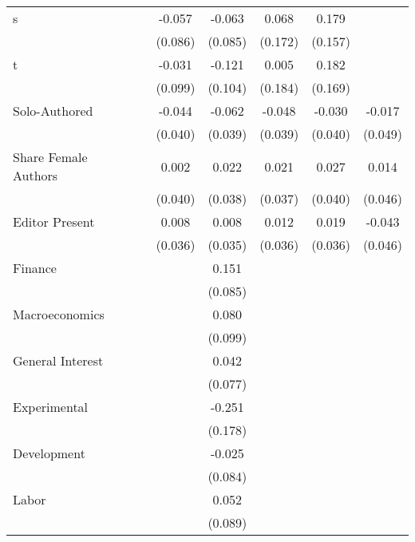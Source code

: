 \begin{tabular}{l*{6}{c}}
s               &         &   -0.057&   -0.063&    0.068&    0.179&         \\
                &         &  (0.086)&  (0.085)&  (0.172)&  (0.157)&         \\
t               &         &   -0.031&   -0.121&    0.005&    0.182&         \\
                &         &  (0.099)&  (0.104)&  (0.184)&  (0.169)&         \\
Solo-Authored   &         &   -0.044&   -0.062&   -0.048&   -0.030&   -0.017\\
                &         &  (0.040)&  (0.039)&  (0.039)&  (0.040)&  (0.049)\\
Share Female Authors&         &    0.002&    0.022&    0.021&    0.027&    0.014\\
                &         &  (0.040)&  (0.038)&  (0.037)&  (0.040)&  (0.046)\\
Editor Present  &         &    0.008&    0.008&    0.012&    0.019&   -0.043\\
                &         &  (0.036)&  (0.035)&  (0.036)&  (0.036)&  (0.046)\\
Finance         &         &         &    0.151&         &         &         \\
                &         &         &  (0.085)&         &         &         \\
Macroeconomics  &         &         &    0.080&         &         &         \\
                &         &         &  (0.099)&         &         &         \\
General Interest&         &         &    0.042&         &         &         \\
                &         &         &  (0.077)&         &         &         \\
Experimental    &         &         &   -0.251&         &         &         \\
                &         &         &  (0.178)&         &         &         \\
Development     &         &         &   -0.025&         &         &         \\
                &         &         &  (0.084)&         &         &         \\
Labor           &         &         &    0.052&         &         &         \\
                &         &         &  (0.089)&         &         &         \\

\end{tabular}
